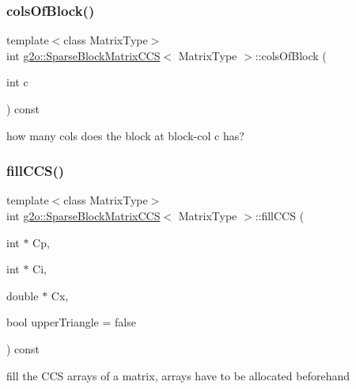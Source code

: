 \subsubsection{\texorpdfstring{cols\+Of\+Block()}{colsOfBlock()}}
{\footnotesize\ttfamily template$<$class Matrix\+Type$>$ \\
int \mbox{\hyperlink{classg2o_1_1_sparse_block_matrix_c_c_s}{g2o\+::\+Sparse\+Block\+Matrix\+C\+CS}}$<$ Matrix\+Type $>$\+::cols\+Of\+Block (\begin{DoxyParamCaption}\item[{int}]{c }\end{DoxyParamCaption}) const\hspace{0.3cm}{\ttfamily [inline]}}



how many cols does the block at block-\/col c has? 

\mbox{\label{classg2o_1_1_sparse_block_matrix_c_c_s_a1751f9966ed8ab54d5a2942388407261}} 
\subsubsection{\texorpdfstring{fill\+C\+C\+S()}{fillCCS()}\hspace{0.1cm}{\footnotesize\ttfamily [1/2]}}
{\footnotesize\ttfamily template$<$class Matrix\+Type$>$ \\
int \mbox{\hyperlink{classg2o_1_1_sparse_block_matrix_c_c_s}{g2o\+::\+Sparse\+Block\+Matrix\+C\+CS}}$<$ Matrix\+Type $>$\+::fill\+C\+CS (\begin{DoxyParamCaption}\item[{int $\ast$}]{Cp,  }\item[{int $\ast$}]{Ci,  }\item[{double $\ast$}]{Cx,  }\item[{bool}]{upper\+Triangle = {\ttfamily false} }\end{DoxyParamCaption}) const\hspace{0.3cm}{\ttfamily [inline]}}

fill the C\+CS arrays of a matrix, arrays have to be allocated beforehand \mbox{\label{classg2o_1_1_sparse_block_matrix_c_c_s_a6bb0a7087552ec2d777c64de43d955f1}} 
